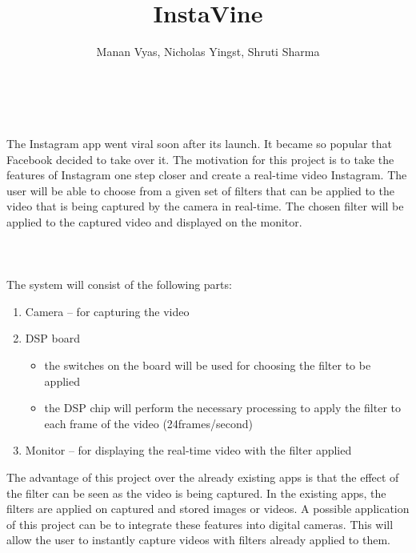 \documentclass{article}
\title{InstaVine}
\author{Manan Vyas, Nicholas Yingst, Shruti Sharma}
\begin{document}
\maketitle


\\\\
The Instagram app went viral soon after its launch. It became so popular that Facebook decided to take over it. The motivation for this project is to take the features of Instagram one step closer and create a real-time video Instagram. The user will be able to choose from a given set of filters that can be applied to the video that is being captured by the camera in real-time. The chosen filter will be applied to the captured video and displayed on the monitor.\\\\


\\\\
The system will consist of the following parts:\\
\begin{enumerate}
\item Camera – for capturing the video
\item DSP board 
\begin{itemize}
\item the switches on the board will be used for choosing the filter to be applied
\item the DSP chip will perform the necessary processing to apply the filter to each frame of the video (24frames/second)
\end{itemize}
\item Monitor – for displaying the real-time video with the filter applied
\end{enumerate}
The advantage of this project over the already existing apps is that the effect of the filter can be seen as the video is being captured. In the existing apps, the filters are applied on captured and stored images or videos. A possible application of this project can be to integrate these features into digital cameras. This will allow the user to instantly capture videos with filters already applied to them.\\\\
 
\end{document}
